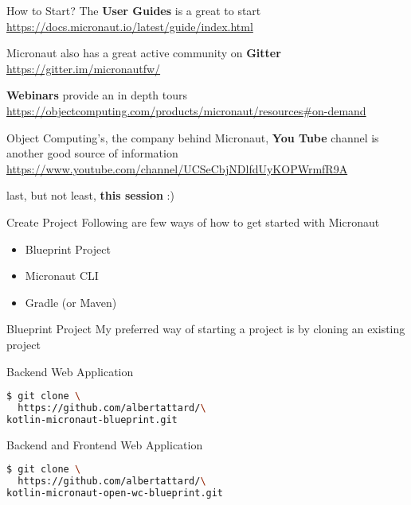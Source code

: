 \documentclass{beamer}
\begin{document}
  \begin{frame}[t]{How to Start?}
    The \textbf{User Guides} is a great to start
    \newline
    {\footnotesize \href{https://docs.micronaut.io/latest/guide/index.html}{https://docs.micronaut.io/latest/guide/index.html}}

    Micronaut also has a great active community on \textbf{Gitter}
    \newline
    {\footnotesize \href{https://gitter.im/micronautfw/}{https://gitter.im/micronautfw/}}

    \textbf{Webinars} provide an in depth tours
    \newline
    {\footnotesize \href{https://objectcomputing.com/products/micronaut/resources\#on-demand}{https://objectcomputing.com/products/micronaut/resources\#on-demand}}

    Object Computing's, the company behind Micronaut, \textbf{You Tube} channel is another good source of information
    \newline
    {\footnotesize \href{https://www.youtube.com/channel/UCSeCbjNDlfdUyKOPWrmfR9A}{https://www.youtube.com/channel/UCSeCbjNDlfdUyKOPWrmfR9A}}

    last, but not least, \textbf{this session} :)
  \end{frame}


  \begin{frame}[t]{Create Project}
    Following are few ways of how to get started with Micronaut

    \begin{itemize}
      \item Blueprint Project
      \item Micronaut CLI
      \item Gradle (or Maven)
    \end{itemize}
  \end{frame}


  \begin{frame}[t,fragile]{Blueprint Project}
    My preferred way of starting a project is by cloning an existing project

    Backend Web Application
    \begin{lstlisting}[language=bash, backgroundcolor = \color{green!5}]
$ git clone \
  https://github.com/albertattard/\
kotlin-micronaut-blueprint.git
    \end{lstlisting}

    Backend and Frontend Web Application
    \begin{lstlisting}[language=bash, backgroundcolor = \color{green!5}]
$ git clone \
  https://github.com/albertattard/\
kotlin-micronaut-open-wc-blueprint.git
\end{lstlisting}
\end{frame}
\end{document}
